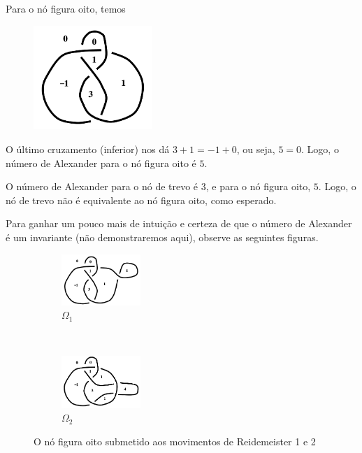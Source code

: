 \documentclass[a4paper,portuguese,11pt,twoside, leqno]{book}
\theoremstyle{definition}
\begin{document}
	\par\vspace{0.3cm} Para o nó figura oito, temos
	\begin{figure}[H]
		\label{no de oito preenchido}
		\begin{center}
			\includegraphics[width=4.5cm]{Images/no_de_oito_preenchido.png}
		\end{center}
	\end{figure}
	\par\vspace{0.3cm} O último cruzamento (inferior) nos dá $3+1=-1+0$, ou seja, $5=0$. Logo, o número de Alexander para o nó figura oito é $5$.
	\par\vspace{0.3cm} O número de Alexander para o nó de trevo é $3$, e para o nó figura oito, $5$. Logo, o nó de trevo não é equivalente ao nó figura oito, como esperado.
	\par\vspace{0.3cm} Para ganhar um pouco mais de intuição e certeza de que o número de Alexander é um invariante (não demonstraremos aqui), observe as seguintes figuras.
	\begin{figure}[H]
		\centering
		\begin{subfigure}[t]{0.5\textwidth}
			\centering
			\includegraphics[width=3cm]{Images/no_de_oito_com_cruzamento_extra.png}
			\caption{$\Omega_1$}
			\label{numero de Alexander e Reidemeister 1}
		\end{subfigure}%
		~
		\begin{subfigure}[t]{0.5\textwidth}
			\centering
			\includegraphics[width=3cm]{Images/no_de_oito_com_corda_por_baixo.png}
			\caption{$\Omega_2$}
			\label{numero de Alexander e Reidemeister 2}
		\end{subfigure}
		\caption{O nó figura oito submetido aos movimentos de Reidemeister 1 e 2}
	\end{figure}
\end{document}
